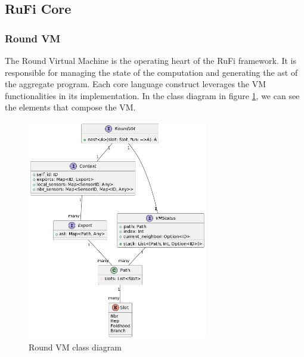 \subsection{RuFi Core}
\subsubsection{Round VM}
The Round Virtual Machine is the operating heart of the RuFi framework. It is responsible for managing the state of the computation and generating the \ac{ast} of the aggregate program.
Each core language construct leverages the VM functionalities in its implementation.
In the class diagram in figure \ref{fig:round-vm-class}, we can see the elements that compose the VM.

\begin{figure}[ht!]
    \centering
    \includegraphics[width=0.7\textwidth]{figures/diagrams/img/round-vm-class.png}
    \caption{Round VM class diagram}
    \label{fig:round-vm-class}
\end{figure}

